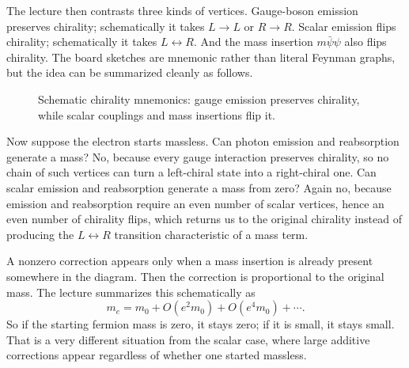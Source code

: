 The lecture then contrasts three kinds of vertices. Gauge-boson emission preserves chirality; schematically it takes \(L\to L\) or \(R\to R\). Scalar emission flips chirality; schematically it takes \(L\leftrightarrow R\). And the mass insertion \(m\bar\psi\psi\) also flips chirality. The board sketches are mnemonic rather than literal Feynman graphs, but the idea can be summarized cleanly as follows.

\begin{figure}[htbp]
\centering
{}
\caption{Schematic chirality mnemonics: gauge emission preserves chirality, while scalar couplings and mass insertions flip it.}
\end{figure}

Now suppose the electron starts massless. Can photon emission and reabsorption generate a mass? No, because every gauge interaction preserves chirality, so no chain of such vertices can turn a left-chiral state into a right-chiral one. Can scalar emission and reabsorption generate a mass from zero? Again no, because emission and reabsorption require an even number of scalar vertices, hence an even number of chirality flips, which returns us to the original chirality instead of producing the \(L\leftrightarrow R\) transition characteristic of a mass term.

A nonzero correction appears only when a mass insertion is already present somewhere in the diagram. Then the correction is proportional to the original mass. The lecture summarizes this schematically as
\begin{equation}
m_e=m_0+O(e^2m_0)+O(e^4m_0)+\cdots.
\end{equation}
So if the starting fermion mass is zero, it stays zero; if it is small, it stays small. That is a very different situation from the scalar case, where large additive corrections appear regardless of whether one started massless.

